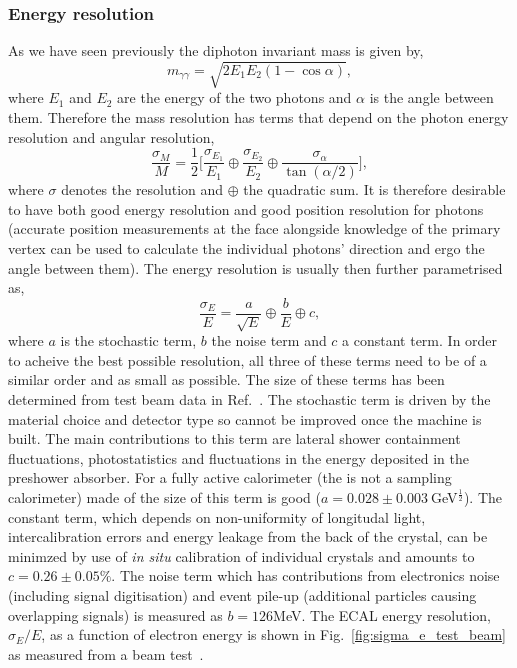 \subsubsection{Energy resolution}
As we have seen previously the diphoton invariant mass is given by,
\begin{equation}
  m_{\gamma\gamma} = \sqrt{2E_{1}E_{2}(1-\cos\alpha)},
  \label{eq:dipho_inv_mass}
\end{equation}
where $E_{1}$ and $E_{2}$ are the energy of the two photons and $\alpha$ is the angle between them. Therefore the mass resolution has terms that depend on the photon energy resolution and angular resolution,
\begin{equation}
  \frac{\sigma_{M}}{M} = \frac{1}{2} \Biggl[ \frac{\sigma_{E_{1}}}{E_{1}} \oplus \frac{\sigma_{E_{2}}}{E_{2}} \oplus \frac{\sigma_{\alpha}}{\tan(\alpha/2)} \Biggr],
  \label{eq:mass_res}
\end{equation}
where $\sigma$ denotes the resolution and $\oplus$ the quadratic sum. It is therefore desirable to have both good energy resolution and good position resolution for photons (accurate position measurements at the \ECAL face alongside knowledge of the primary vertex can be used to calculate the individual photons' direction and ergo the angle between them). The energy resolution is usually then further parametrised as,
\begin{equation}
  \frac{\sigma_{E}}{E} = \frac{a}{\sqrt{E}} \oplus \frac{b}{E} \oplus c,
  \label{eq:energy_res}
\end{equation}
where $a$ is the stochastic term, $b$ the noise term and $c$ a constant term. In order to acheive the best possible resolution, all three of these terms need to be of a similar order and as small as possible. The size of these terms has been determined from test beam data in Ref.~\cite{CMS_JINST}. The stochastic term is driven by the material choice and detector type so cannot be improved once the machine is built. The main contributions to this term are lateral shower containment fluctuations, photostatistics and fluctuations in the energy deposited in the preshower absorber. For a fully active calorimeter (the \CMS \ECAL is not a sampling calorimeter) made of \PbWO the size of this term is good ($a=0.028\pm0.003~$GeV$^{\frac{1}{2}}$). The constant term, which depends on non-uniformity of longitudal light, intercalibration errors and energy leakage from the back of the crystal, can be minimzed by use of \emph{in situ} calibration of individual crystals and amounts to $c=0.26\pm0.05\%$. The noise term which has contributions from electronics noise (including signal digitisation) and event pile-up (additional particles causing overlapping signals) is measured as $b=126$MeV. The ECAL energy resolution, $\sigma_{E}/E$, as a function of electron energy is shown in Fig.~\ref{fig:sigma_e_test_beam} as measured from a beam test~\cite{CMS_JINST}. 
